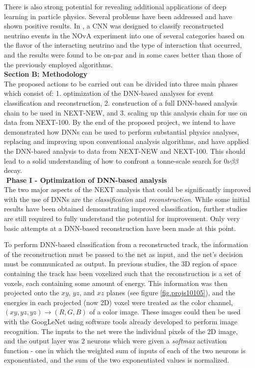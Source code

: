 \documentclass[11pt,a4paper]{article}
\begin{document}
There is also strong potential for revealing additional applications of deep learning in particle physics. Several problems have been addressed and have shown positive results. In \cite{Aurisano_2016}, a CNN was designed to classify reconstructed neutrino events in the NOvA experiment into one of several categories based on the flavor of the interacting neutrino and the type of interaction that occurred, and the results were found to be on-par and in some cases better than those of the previously employed algorithms.\\

{\noindent\textbf{Section B: Methodology}}\\
The proposed actions to be carried out can be divided into three main phases which consist of: 1. optimization of the DNN-based analyses for event classification and reconstruction, 2. construction of a full DNN-based analysis chain to be used in NEXT-NEW, and 3. scaling up this analysis chain for use on data from NEXT-100. By the end of the proposed project, we intend to have demonstrated how DNNs can be used to perform substantial physics analyses, replacing and improving upon conventional analysis algorithms, and have applied the DNN-based analysis to data from NEXT-NEW and NEXT-100. This should lead to a solid understanding of how to confront a tonne-scale search for $0\nu\beta\beta$ decay.\\

\noindent\textbf{\textbullet\,\,Phase I - Optimization of DNN-based analysis}\\
The two major aspects of the NEXT analysis that could be significantly improved with the use of DNNs are the \emph{classification} and \emph{reconstruction}. While some initial results have been obtained demonstrating improved classification, further studies are still required to fully understand the potential for improvement. Only very basic attempts at a DNN-based reconstruction have been made at this point.

To perform DNN-based classification from a reconstructed track, the information of the reconstruction must be passed to the net as input, and the net's decision must be communicated as output. In previous studies, the 3D region of space containing the track has been voxelized such that the reconstruction is a set of voxels, each containing some amount of energy. This information was then projected onto the $xy$, $yz$, and $xz$ planes (see figure \ref{fig.projs10105}), and the energies in each projected (now 2D) voxel were treated as the color channel, $(xy, yz, yz) \rightarrow (R, G, B)$ of a color image. These images could then be used with the GoogLeNet using software tools already developed to perform image recognition. The inputs to the net were the individual pixels of the 2D image, and the output layer was 2 neurons which were given a \emph{softmax} activation function - one in which the weighted sum of inputs of each of the two neurons is exponentiated, and the sum of the two exponentiated values is normalized. 
\end{document}
